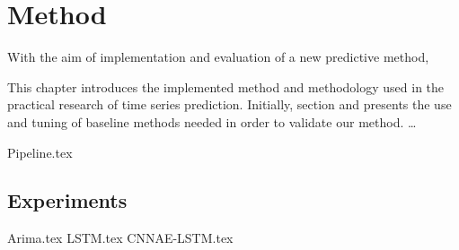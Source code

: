 \chapter{Method}
\label{cha:Method}

With the aim of implementation and evaluation of a new predictive method,

This chapter introduces the implemented method and methodology used in the practical research of time series prediction.
Initially, section  and  presents the use and tuning of baseline methods needed in order to validate our method.
\dots

{Pipeline.tex}

\section{Experiments}
{Arima.tex}
{LSTM.tex}
{CNNAE-LSTM.tex}
